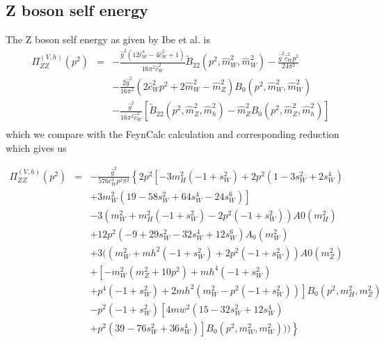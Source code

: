 \documentclass[11pt]{article}
\begin{document}
\subsection{Z boson self energy}

The Z boson self energy as given by Ibe et al. is
{
\begin{eqnarray}
\Pi_{ZZ}^{(V,h)}(p^2) &=& 
-\frac{ \hat{g}^2 (12\hat{c}_W^4 - 4\hat{c}_W^2 + 1) }{16\pi^2 \hat{c}_W^2}
\tilde B_{22}(p^2, \hat{m}_W^2, \hat{m}_W^2) 
-\frac{ \hat{g}^2 \hat{c}_W^2 p^2 }{24\pi^2} \nonumber \\
&& -\frac{2\hat{g}^2}{16\pi^2}(2\hat{c}_W^2 p^2 + 2\hat{m}_W^2 - \hat{m}_Z^2)
B_0(p^2, \hat{m}_W^2, \hat{m}_W^2) \nonumber \\
&& -\frac{ \hat{g}^2 }{16\pi^2 \hat{c}_W^2}
[\tilde B_{22}(p^2, \hat{m}_Z^2, \hat{m}_h^2)
-\hat{m}_Z^2 B_0(p^2, \hat{m}_Z^2, \hat{m}_h^2) ]\\
\end{eqnarray}
}
which we compare with the FeynCalc calculation and corresponding reduction which gives us

{
\begin{eqnarray}
\Pi_{ZZ}^{(V,h)}(p^2) &=& 
-\frac{ \hat{g}^2} {576 c_W^4 p^2 \pi^2}\left\{
2 p^2 \left[-3 m_H^2 (-1 + s_W^2) + 2 p^2 (1 - 3 s_W^2 + 2 s_W^4) \right. \right.\nonumber\\
&& \left.+ 3 m_W^2 (19 - 58 s_W^2 + 64 s_W^4 - 24 s_W^6)\right] \nonumber\\
&&- 3 (m_W^2 + m_H^2 (-1 + s_W^2) - 2 p^2 (-1 + s_W^2)) A0\left(m_H^2\right)  \nonumber\\
 &&  + 12 p^2 (-9 + 29 s_W^2 - 32 s_W^4 + 12 s_W^6) A_0\left(m_W^2\right)  \nonumber\\
   && +3 ((m_W^2 + mh^2 (-1 + s_W^2) + 2 p^2 (-1 + s_W^2)) A0\left(m_Z^2\right)  \nonumber\\
   &&+ \left[-m_W^2 (m_Z^2 + 10 p^2) + mh^4 (-1 + s_W^2)\right.  \nonumber\\
   && \left. +     p^4 (-1 + s_W^2) + 2 mh^2 (m_W^2 - p^2 (-1 + s_W^2))\right] B_0\left(p^2, m_H^2, m_Z^2\right)  \nonumber\\
&&   -    p^2 (-1 + s_W^2) \left[4 mw^2 (15 - 32 s_W^2 + 12 s_W^4)\right.  \nonumber\\
&&  \left.      \left. +  p^2 (39 - 76 s_W^2 + 36 s_W^4)\right] B_0\left(p^2, m_W^2, m_W^2\right)))\right\}
\end{eqnarray}
}
\end{document}
